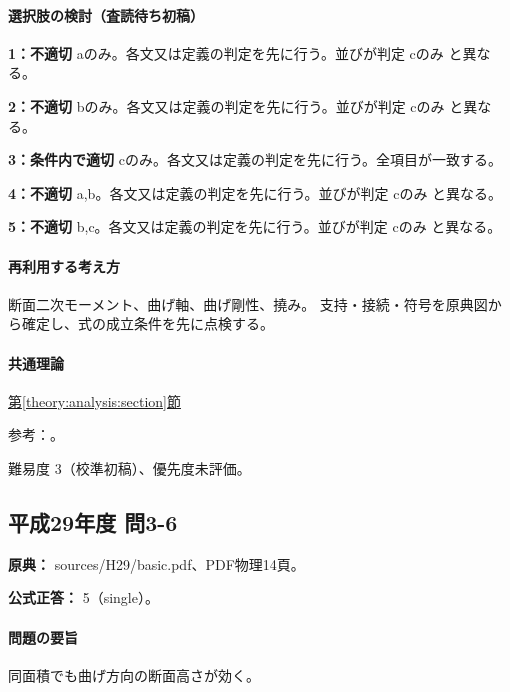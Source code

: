 \paragraph{選択肢の検討（査読待ち初稿）}\mbox{}\par

\noindent\textbf{1：不適切} aのみ。各文又は定義の判定を先に行う。並びが判定 cのみ と異なる。\par

\noindent\textbf{2：不適切} bのみ。各文又は定義の判定を先に行う。並びが判定 cのみ と異なる。\par

\noindent\textbf{3：条件内で適切} cのみ。各文又は定義の判定を先に行う。全項目が一致する。\par

\noindent\textbf{4：不適切} a,b。各文又は定義の判定を先に行う。並びが判定 cのみ と異なる。\par

\noindent\textbf{5：不適切} b,c。各文又は定義の判定を先に行う。並びが判定 cのみ と異なる。\par

\paragraph{再利用する考え方} 断面二次モーメント、曲げ軸、曲げ剛性、撓み。 支持・接続・符号を原典図から確定し、式の成立条件を先に点検する。

\paragraph{共通理論} \hyperref[theory:analysis:section]{第\ref*{theory:analysis:section}節}

\par 参考：\cite{struct_mit_beam}。

\par 難易度 3（校準初稿）、優先度未評価。

\subsection{平成29年度 問3-6}
\label{q:h29-reg-basic-3-6}

\noindent\textbf{原典：} sources/H29/basic.pdf、PDF物理14頁。

\textbf{公式正答：} 5（single）。

\paragraph{問題の要旨} 同面積でも曲げ方向の断面高さが効く。

